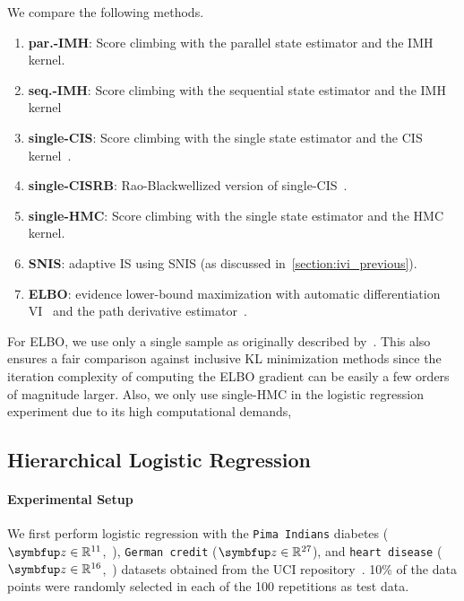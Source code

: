We compare the following methods.
\vspace{-0.1in}
\begin{enumerate}[noitemsep]
  \item[\ding{182}] \textbf{par.-IMH}: Score climbing with the parallel state estimator and the IMH kernel. 
  \item[\ding{183}] \textbf{seq.-IMH}: Score climbing with the sequential state estimator and the IMH kernel 
  \item[\ding{184}] \textbf{single-CIS}: Score climbing with the single state estimator and the CIS kernel~\citep{NEURIPS2020_b2070693}.
  \item[\ding{185}] \textbf{single-CISRB}: Rao-Blackwellized version of single-CIS~\citep{NEURIPS2020_b2070693}.
  \item[\ding{184}] \textbf{single-HMC}: Score climbing with the single state estimator and the HMC kernel.
  \item[\ding{186}] \textbf{SNIS}: adaptive IS using SNIS (as discussed in~\cref{section:ivi_previous}).
  \item[\ding{187}] \textbf{ELBO}: evidence lower-bound maximization with automatic differentiation VI~\citep{pmlr-v33-ranganath14, JMLR:v18:16-107} and the path derivative estimator~\citep{NIPS2017_e91068ff}.
\end{enumerate}
\vspace{-0.05in}
For ELBO, we use only a single sample as originally described by~\citet{NIPS2017_e91068ff}.
This also ensures a fair comparison against inclusive KL minimization methods since the iteration complexity of computing the ELBO gradient can be easily a few orders of magnitude larger.
Also, we only use single-HMC in the logistic regression experiment due to its high computational demands, 


\subsection{Hierarchical Logistic Regression}\label{section:logistic}
\vspace{-0.05in}
\paragraph{Experimental Setup}
We first perform logistic regression with the \texttt{Pima Indians} diabetes (\(\vz \in \mathbb{R}^{11}\),~\citealt{smith_using_1988}), \texttt{German credit} (\(\vz \in \mathbb{R}^{27}\)), and \texttt{heart disease} (\(\vz \in \mathbb{R}^{16}\),~\citealt{detrano_international_1989}) datasets obtained from the UCI repository~\citep{Dua:2019}.
10\% of the data points were randomly selected in each of the 100 repetitions as test data.

